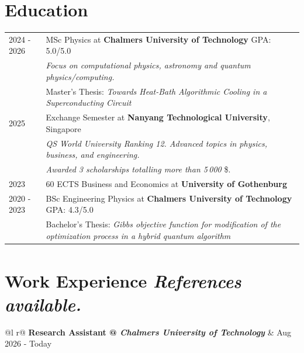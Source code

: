 \documentclass[a4paper,11pt]{article}
\begin{document}
\section{Education}
\begin{tabularx}{\linewidth}{@{}l X@{}}	
2024 - 2026 &MSc Physics at \textbf{Chalmers University of Technology} \hfill GPA: 5.0/5.0\\
&\textit{Focus on computational physics, astronomy and quantum physics/computing.} \\
& Master's Thesis: \textit{Towards Heat-Bath Algorithmic Cooling in a Superconducting Circuit} \\[5pt]

2025 &Exchange Semester at \textbf{Nanyang Technological University}, Singapore \\
&\textit{QS World University Ranking 12. Advanced topics in physics, business, and engineering.} \\
& \textit{Awarded 3 scholarships totalling more than 5\,000} \$.\\[5pt]

2023 & 60 ECTS Business and Economics at \textbf{University of Gothenburg} \hfill \\[5pt] 

2020 - 2023 &BSc Engineering Physics at \textbf{Chalmers University of Technology} \hfill GPA: 4.3/5.0 \\
& Bachelor's Thesis: \textit{Gibbs objective function for modification of the optimization process in a hybrid quantum algorithm} \\[5pt]

\end{tabularx}

\section{\texorpdfstring
  {Work Experience \hfill \footnotesize\textsuperscript{\textcolor{black}{\faInfoCircle}} \textit{References available.}}
  {Work Experience (References available.)}}
\begin{tabularx}{\linewidth}{ @{}l r@{} }
\textbf{Research Assistant @ \textit{Chalmers University of Technology}} & \hfill Aug 2026 - Today \\[3.pt]
\end{tabularx}
\end{document}
